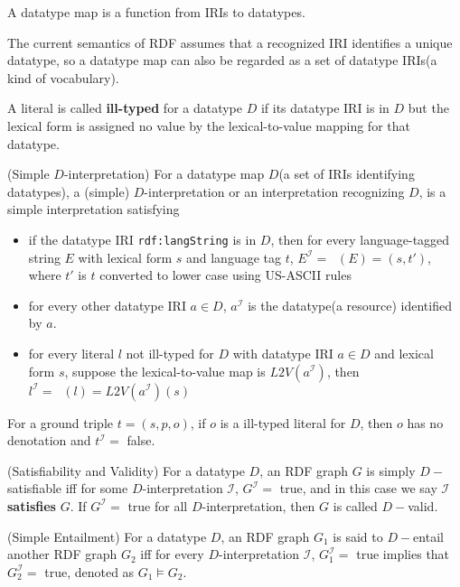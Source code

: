 \documentclass{article}
\DeclareMathOperator{\IL}{I_{L}}
\begin{document}
\begin{defin}
A datatype map is a function from IRIs to datatypes.
\end{defin}
The current semantics of RDF assumes that a recognized IRI identifies a unique datatype, so a datatype map can also be regarded as a set of datatype IRIs(a kind of vocabulary).

\begin{defin}
A literal is called \textbf{ill-typed} for a datatype $D$ if its datatype IRI is in $D$ but the lexical form is assigned no value by the lexical-to-value mapping for that datatype.
\end{defin}

\begin{defin}(Simple $D$-interpretation)
For a datatype map $D$(a set of IRIs identifying datatypes), a (simple) $D$-interpretation or an interpretation recognizing $D$, is a simple interpretation satisfying 
\begin{itemize}
\item if the datatype IRI \texttt{rdf:langString} is in $D$, then for every language-tagged string $E$ with lexical form $s$ and language tag $t$, $E^{\mathcal{I}} = \IL(E) = (s,t')$, where $t'$ is $t$ converted to lower case using US-ASCII rules 
\item for every other datatype IRI $a\in D$, $a^{\mathcal{I}}$ is the datatype(a resource) identified by $a$. 
\item for every literal $l$ not ill-typed for $D$ with datatype IRI $a \in D$ and lexical form $s$, suppose the lexical-to-value map is $L2V(a^{\mathcal{I}})$, then $l^{\mathcal{I}} = \IL(l) = L2V(a^{\mathcal{I}})(s)$
\end{itemize}
\end{defin}
 For a ground triple $t = (s,p,o)$, if $o$ is a ill-typed literal for $D$, then $o$ has no denotation and $t^{\mathcal{I}} = $ false. 

\begin{defin}(Satisfiability and Validity)\newline
For a datatype $D$, an RDF graph $G$ is  simply $D-$satisfiable iff for some $D$-interpretation $\mathcal{I}$, $G^{\mathcal{I}} = $ true, and in this case we say $\mathcal{I}$ \textbf{satisfies} $G$. If $G^{\mathcal{I}} = $ true for all $D$-interpretation, then $G$ is called $D-$valid. 
\end{defin}

\begin{defin}(Simple Entailment)\newline
For a datatype $D$, an RDF graph $G_1$ is said to $D-$entail another RDF graph $G_2$ iff for every $D$-interpretation $\mathcal{I}$, $G_1^{\mathcal{I}} = $ true implies that $G_2^{\mathcal{I}} = $ true, denoted as $G_1 \vDash G_2$.
\end{defin}
\end{document}
